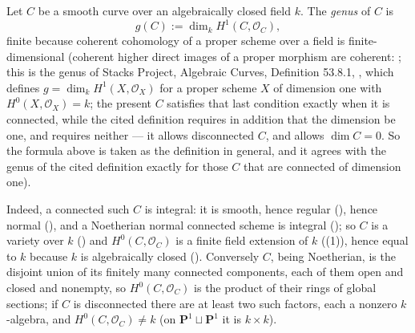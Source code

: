 \begin{definition}
\label{def:pcb-genus}
Let \(C\) be a  smooth curve over
an algebraically closed field \(k\).  The \emph{genus} of \(C\) is
\[
 g(C):=\dim_kH^1(C,\mathcal O_C),
\]
finite because coherent cohomology of a proper scheme over a field
is finite-dimensional (coherent higher direct images of a proper
morphism are coherent: ; this is the genus of
Stacks Project, Algebraic Curves, Definition 53.8.1,
, which
defines \(g=\dim_kH^1(X,\mathcal O_X)\) for a proper scheme \(X\) of
dimension one with \(H^0(X,\mathcal O_X)=k\); the present \(C\)
satisfies that last condition exactly when it is connected, while the
cited definition requires in addition that the dimension be one, and
 requires neither --- it allows disconnected
\(C\), and allows \(\dim C=0\).  So the formula above is taken as the
definition in general, and it agrees with the genus of the cited
definition exactly for those \(C\) that are connected of dimension
one).

Indeed, a connected such \(C\) is integral: it is smooth, hence
regular (), hence normal
(), and a Noetherian normal connected
scheme is integral ();
so \(C\) is a variety over \(k\) () and
\(H^0(C,\mathcal O_C)\) is a finite field extension of \(k\)
((1)), hence equal to \(k\) because
\(k\) is algebraically closed
().  Conversely \(C\), being
Noetherian, is the disjoint union of its finitely many connected
components, each of them open and closed and nonempty, so
\(H^0(C,\mathcal O_C)\) is the product of their rings of global
sections; if \(C\) is disconnected there are at least two such
factors, each a nonzero \(k\)-algebra, and \(H^0(C,\mathcal O_C)\neq
k\) (on \(\mathbf P^1\sqcup\mathbf P^1\) it is \(k\times k\)).


\end{definition}
